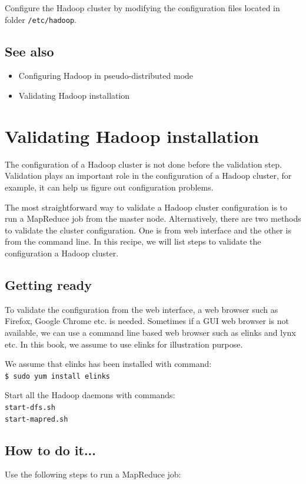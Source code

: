 Configure the Hadoop cluster by modifying the configuration files located in folder \verb|/etc/hadoop|. \\
\subsection*{See also}
\begin{itemize}
  \item Configuring Hadoop in pseudo-distributed mode
  \item Validating Hadoop installation
\end{itemize}

\section{Validating Hadoop installation}
The configuration of a Hadoop cluster is not done before the validation step. Validation plays an important role in the configuration of a Hadoop cluster, for example, it can help us figure out configuration problems.

The most straightforward way to validate a Hadoop cluster configuration is to run a MapReduce job from the master node. Alternatively, there are two methods to validate the cluster configuration. One is from web interface and the other is from the command line. In this recipe, we will list steps to validate the configuration a Hadoop cluster.
\subsection*{Getting ready}
To validate the configuration from the web interface, a web browser such as Firefox, Google Chrome etc. is needed. Sometimes if a GUI web browser is not available, we can use a command line based web browser such as elinks and lynx etc. In this book, we assume to use elinks for illustration purpose.

We assume that elinks has been installed with command: \\
\verb|$ sudo yum install elinks|

Start all the Hadoop daemons with commands: \\
\verb|start-dfs.sh| \\
\verb|start-mapred.sh|

\subsection*{How to do it...}
Use the following steps to run a MapReduce job:

